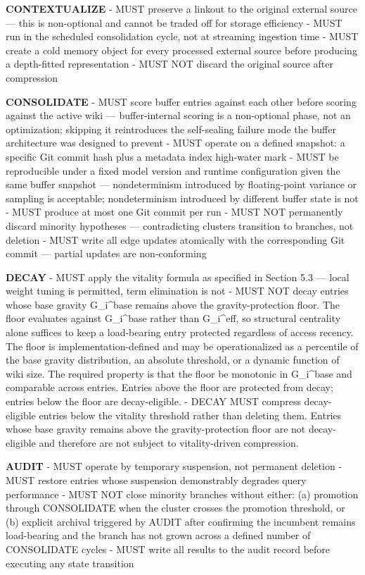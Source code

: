 \documentclass[
  11pt,
]{article}
\begin{document}
\textbf{CONTEXTUALIZE} - MUST preserve a linkout to the original
external source --- this is non-optional and cannot be traded off for
storage efficiency - MUST run in the scheduled consolidation cycle, not
at streaming ingestion time - MUST create a cold memory object for every
processed external source before producing a depth-fitted representation
- MUST NOT discard the original source after compression

\textbf{CONSOLIDATE} - MUST score buffer entries against each other
before scoring against the active wiki --- buffer-internal scoring is a
non-optional phase, not an optimization; skipping it reintroduces the
self-sealing failure mode the buffer architecture was designed to
prevent - MUST operate on a defined snapshot: a specific Git commit hash
plus a metadata index high-water mark - MUST be reproducible under a
fixed model version and runtime configuration given the same buffer
snapshot --- nondeterminism introduced by floating-point variance or
sampling is acceptable; nondeterminism introduced by different buffer
state is not - MUST produce at most one Git commit per run - MUST NOT
permanently discard minority hypotheses --- contradicting clusters
transition to branches, not deletion - MUST write all edge updates
atomically with the corresponding Git commit --- partial updates are
non-conforming

\textbf{DECAY} - MUST apply the vitality formula as specified in Section
5.3 --- local weight tuning is permitted, term elimination is not - MUST
NOT decay entries whose base gravity G\_i\^{}base remains above the
gravity-protection floor. The floor evaluates against G\_i\^{}base
rather than G\_i\^{}eff, so structural centrality alone suffices to keep
a load-bearing entry protected regardless of access recency. The floor
is implementation-defined and may be operationalized as a percentile of
the base gravity distribution, an absolute threshold, or a dynamic
function of wiki size. The required property is that the floor be
monotonic in G\_i\^{}base and comparable across entries. Entries above
the floor are protected from decay; entries below the floor are
decay-eligible. - DECAY MUST compress decay-eligible entries below the
vitality threshold rather than deleting them. Entries whose base gravity
remains above the gravity-protection floor are not decay-eligible and
therefore are not subject to vitality-driven compression.

\textbf{AUDIT} - MUST operate by temporary suspension, not permanent
deletion - MUST restore entries whose suspension demonstrably degrades
query performance - MUST NOT close minority branches without either: (a)
promotion through CONSOLIDATE when the cluster crosses the promotion
threshold, or (b) explicit archival triggered by AUDIT after confirming
the incumbent remains load-bearing and the branch has not grown across a
defined number of CONSOLIDATE cycles - MUST write all results to the
audit record before executing any state transition
\end{document}
